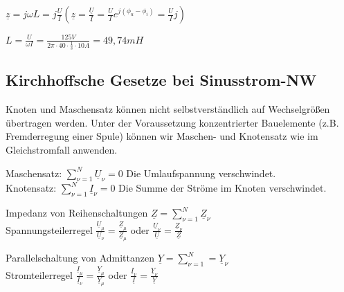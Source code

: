 \documentclass[german]{article}
\begin{document}
$\underline{z} = j\omega L = j \frac{U}{I} (\underline{z} = \frac{\underline{U}}{\underline{I}} = \frac{U}{I} e^{j(\phi_u - \phi_i)} = \frac{U}{I} j )$

$L = \frac{U}{\omega I} = \frac{125V}{2 \pi \cdot 40 \cdot \frac1s \cdot 10A} = 49,74mH$


\subsection{Kirchhoffsche Gesetze bei Sinusstrom-NW}
Knoten und Maschensatz können nicht selbstverständlich auf Wechselgrößen übertragen werden. Unter der Voraussetzung konzentrierter Bauelemente (z.B. Fremderregung einer Spule) können wir Maschen- und Knotensatz wie im Gleichstromfall anwenden.

Maschensatz: $\sum_{\nu = 1}^N \underline{U}_\nu = 0$ Die Umlaufspannung verschwindet. \\
Knotensatz: $\sum_{\nu = 1}^N \underline{I}_\nu = 0$ Die Summe der Ströme im Knoten verschwindet.

Impedanz von Reihenschaltungen $\underline{Z} = \sum_{\nu = 1}^N \underline{Z}_\nu$ \\
Spannungsteilerregel $\frac{\underline{U}_{\mu}}{\underline{U}_{\nu}} = \frac{\underline{Z}_{\mu}}{\underline{Z}_{\mu}}$ oder $\frac{\underline{U}_{\nu}}{\underline{U}} = \frac{\underline{Z}_{\nu}}{\underline{Z}}$

Parallelschaltung von Admittanzen $\underline{Y} = \sum_{\nu = 1}^N = \underline{Y}_\nu$ \\
Stromteilerregel $\frac{\underline{I}_{\mu}}{\underline{I}_{\nu}} = \frac{\underline{Y}_{\mu}}{\underline{Y}_{\mu}}$ oder $\frac{\underline{I}_{\nu}}{\underline{I}} = \frac{\underline{Y}_{\nu}}{\underline{Y}}$
\end{document}
